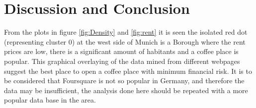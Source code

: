 \documentclass[]{report}
\begin{document}
\section*{Discussion and Conclusion}
From the plots in figure \ref{fig:Density} and \ref{fig:rent} it is seen the isolated red dot (representing cluster 0) at the west side of Munich is a Borough where the rent prices are low, there is a significant amount of habitants and a coffee place is popular. This graphical overlaying of the data mined from different webpages suggest the best  place to open a coffee place with minimum financial risk. It is to be considered that Foursquare is not so popular in Germany, and therefore the data may be insufficient, the analysis done here should be repeated with a more popular data base in the area.    
\end{document}
